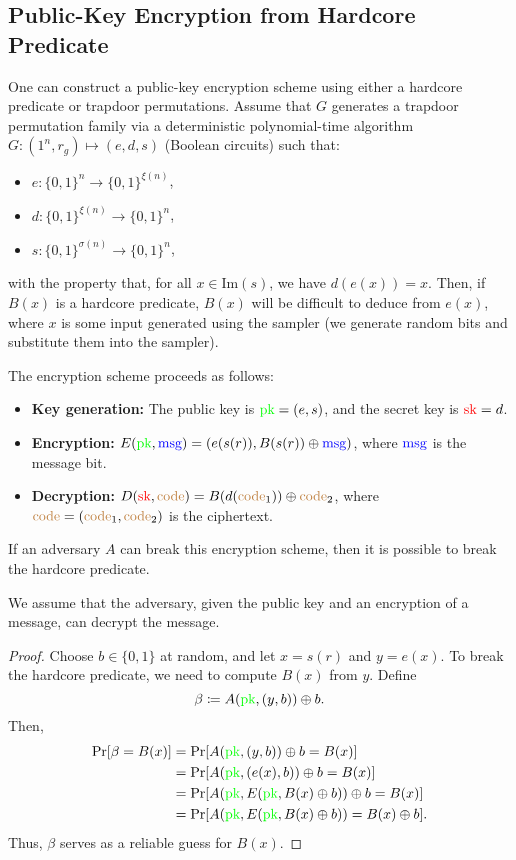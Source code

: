 \subsection{Public-Key Encryption from Hardcore Predicate}
One can construct a public-key encryption scheme using either a hardcore predicate or trapdoor permutations.
Assume that $G$ generates a trapdoor permutation family via a deterministic polynomial-time algorithm $G \colon (1^{n}, r_g) \mapsto (e, d, s)$ (Boolean circuits) such that:
\begin{itemize}
    \item $e \colon \{0,1\}^n \to \{0,1\}^{\xi(n)}$,
    \item $d \colon \{0,1\}^{\xi(n)} \to \{0,1\}^n$,
    \item $s \colon \{0,1\}^{\sigma(n)} \to \{0,1\}^n$,
\end{itemize}
with the property that, for all $x \in \text{Im}(s)$, we have $d(e(x)) = x$.
Then, if $B(x)$ is a hardcore predicate, $B(x)$ will be difficult to deduce from $e(x)$, where $x$ is some input generated using the sampler (we generate random bits and substitute them into the sampler).

The encryption scheme proceeds as follows:
\begin{itemize}
    \item \textbf{Key generation:} The public key is $\textcolor{green}{\text{pk}} = (e, s)$, and the secret key is $\textcolor{red}{\text{sk}} = d$.
    \item \textbf{Encryption:} $E(\textcolor{green}{\text{pk}}, \textcolor{blue}{\text{msg}}) = (e(s(r)), B(s(r)) \oplus \textcolor{blue}{\text{msg}})$, where $\textcolor{blue}{\text{msg}}$ is the message bit.
    \item \textbf{Decryption:} $D(\textcolor{red}{\text{sk}}, \textcolor{brown}{\text{code}}) = B(d(\textcolor{brown}{\text{code}}_1)) \oplus \textcolor{brown}{\text{code}}_2$, where $\textcolor{brown}{\text{code}} = (\textcolor{brown}{\text{code}}_1, \textcolor{brown}{\text{code}}_2)$ is the ciphertext.
\end{itemize}

\begin{lemma}
    If an adversary $A$ can break this encryption scheme, then it is possible to break the hardcore predicate.
\end{lemma}

We assume that the adversary, given the public key and an encryption of a message, can decrypt the message.

\begin{proof}
    Choose $b \in \{0, 1\}$ at random, and let $x = s(r)$ and $y = e(x)$.
    To break the hardcore predicate, we need to compute $B(x)$ from $y$.
    Define
    \[
        \beta \coloneqq A(\textcolor{green}{\text{pk}}, (y, b)) \oplus b.
    \]
    Then,
    \begin{align*}
        \Pr[\beta = B(x)] &= \Pr[A(\textcolor{green}{\text{pk}}, (y, b)) \oplus b = B(x)] \\
                          &= \Pr[A(\textcolor{green}{\text{pk}}, (e(x), b)) \oplus b = B(x)] \\
                          &= \Pr[A(\textcolor{green}{\text{pk}}, E(\textcolor{green}{\text{pk}}, B(x) \oplus b)) \oplus b = B(x)] \\
                          &= \Pr[A(\textcolor{green}{\text{pk}}, E(\textcolor{green}{\text{pk}}, B(x) \oplus b)) = B(x) \oplus b].
    \end{align*}
    Thus, $\beta$ serves as a reliable guess for $B(x)$.
\end{proof}

